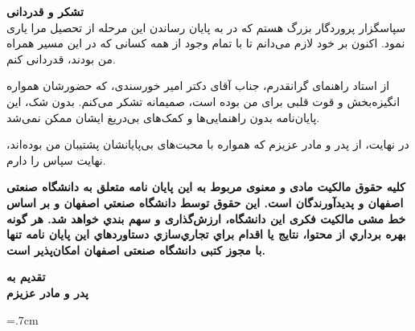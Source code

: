 \thispagestyle{empty}
\vspace*{1.5cm}

{\large
	\textbf{تشکر و قدردانی}\\

	سپاسگزار پروردگار بزرگ هستم که در به پایان رساندن این مرحله از تحصیل مرا یاری نمود. اکنون بر خود لازم می‌دانم تا با تمام وجود از همه کسانی که در این مسیر همراه من بودند، قدردانی کنم.  
	
	از استاد راهنمای گرانقدرم، جناب آقای دکتر امیر خورسندی، که حضورشان همواره انگیزه‌بخش و قوت قلبی برای من بوده است، صمیمانه تشکر می‌کنم. بدون شک، این پایان‌نامه بدون راهنمایی‌ها و کمک‌های بی‌دریغ ایشان ممکن نمی‌شد.
	
	در نهایت، از پدر و مادر عزیزم که همواره با محبت‌های بی‌پایانشان پشتیبان من بوده‌اند، نهایت سپاس را دارم.

}
\restoregeometry
\pagebreak

\thispagestyle{empty}

\begin{spacing}{3}
\leavevmode
\vfill
\parbox{8 cm}{

\textbf{\Large
	 کلیه حقوق مالکیت مادی و معنوی مربوط به اين پايان نامه متعلق به دانشگاه صنعتی اصفهان و پدیدآورندگان است. این حقوق توسط دانشگاه صنعتي اصفهان و بر اساس خط مشی مالکیت فکری این دانشگاه، ارزش‌گذاری و سهم بندي خواهد شد.
	 هر گونه بهره برداري از محتوا، نتايج یا اقدام براي تجاري‌سازي دستاوردهاي اين پايان نامه تنها با مجوز کتبی دانشگاه صنعتی اصفهان امکان‌پذیر است.
	 }

}
\vfill
\end{spacing}
\restoregeometry
\pagebreak

\thispagestyle{empty}
\vspace*{4cm}

{\LARGE
\centering
\textbf{تقدیم به \\ پدر و مادر عزیزم }

}
\pagebreak


\baselineskip=.7cm

